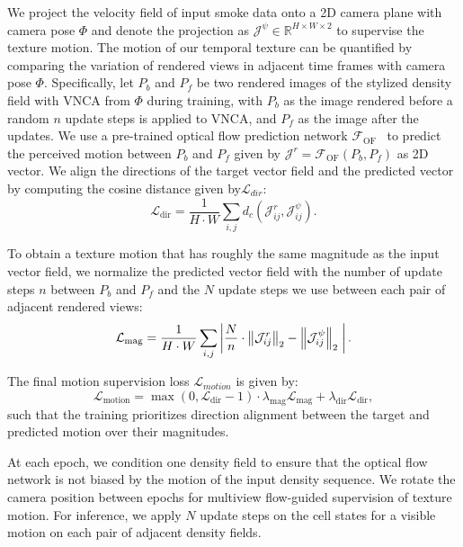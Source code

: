 We project the velocity field of input smoke data onto a 2D camera plane with camera pose $\Phi$ and denote the projection as $\mathcal{J}^\psi \in \mathbb{R}^{H\times W\times 2}$ to supervise the texture motion. 
The motion of our temporal texture can be quantified by comparing the variation of rendered views in adjacent time frames with camera pose $\Phi$.
Specifically, let $P_b$ and $P_f$ be two rendered images of the stylized density field with VNCA from $\Phi$ during training, with $P_b$ as the image rendered before a random $n$ update steps is applied to VNCA, and $P_f$ as the image after the updates. 
We use a pre-trained optical flow prediction network $\mathcal{F}_\text{OF}$~\cite{tesfaldet2018two} to predict the perceived motion between $P_b$ and $P_f$ given by $\mathcal{J}^r = \mathcal{F}_\text{OF}(P_b, P_f)$ as 2D vector. 
We align the directions of the target vector field and the predicted vector by computing the cosine distance given by$\mathcal{L}_{dir}$:
\begin{equation}
\mathcal{L}_\text{dir} = \frac{1}{H\cdot W} \sum_{i, j}d_c(\mathcal{J}^r _{ij}, \mathcal{J}^\psi _{ij}). 
\end{equation}

To obtain a texture motion that has roughly the same magnitude as the input vector field, we normalize the predicted vector field with the number of update steps $n$ between $P_b$ and $P_f$ and the $N$ update steps we use between each pair of adjacent rendered views:
\begin{equation}
\mathcal{L}_\text{mag} = \frac{1}{H\cdot W} \sum_{i, j}  \left | \frac{N}{n} \cdot  \left\lVert\mathcal{J}^r_{ij}\right\rVert _2 -\left\lVert\mathcal{J}^\psi_{ij}\right\rVert_2 \; \right |.
\label{eq:norm_loss}
\end{equation}

The final motion supervision loss $\mathcal{L}_{motion}$ is given by:
\begin{equation}
\mathcal{L}_\text{motion} =  \max(0, \mathcal{L}_\text{dir} - 1) \cdot \lambda_\text{mag}\mathcal{L}_\text{mag} + \lambda_\text{dir} \mathcal{L}_\text{dir},
\end{equation} 
such that the training prioritizes direction alignment between the target and predicted motion over their magnitudes.

At each epoch, we condition one density field to ensure that the optical flow network is not biased by the motion of the input density sequence. We rotate the camera position between epochs for multiview flow-guided supervision of texture motion. 
For inference, we apply $N$ update steps on the cell states for a visible motion on each pair of adjacent density fields. 

